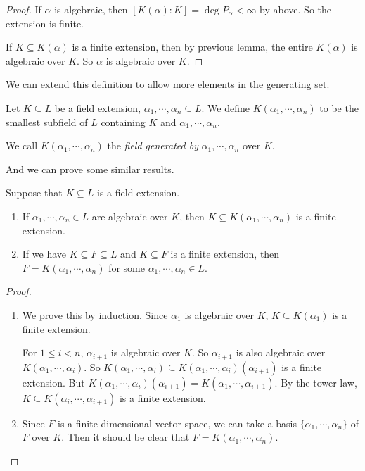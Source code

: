 \documentclass[a4paper]{article}
\begin{document}
\begin{proof}
  If $\alpha$ is algebraic, then $[K(\alpha): K] = \deg P_\alpha < \infty$ by above. So the extension is finite.

  If $K\subseteq K(\alpha)$ is a finite extension, then by previous lemma, the entire $K(\alpha)$ is algebraic over $K$. So $\alpha$ is algebraic over $K$.
\end{proof}

We can extend this definition to allow more elements in the generating set.
\begin{defi}
  Let $K\subseteq L$ be a field extension, $\alpha_1, \cdots, \alpha_n\subseteq L$. We define $K(\alpha_1, \cdots, \alpha_n)$ to be the smallest subfield of $L$ containing $K$ and $\alpha_1, \cdots, \alpha_n$.

  We call $K(\alpha_1, \cdots, \alpha_n)$ the \emph{field generated by} $\alpha_1, \cdots, \alpha_n$ over $K$.
\end{defi}

And we can prove some similar results.

\begin{thm}
  Suppose that $K\subseteq L$ is a field extension.
  \begin{enumerate}
    \item If $\alpha_1, \cdots, \alpha_n \in L$ are algebraic over $K$, then $K\subseteq K(\alpha_1, \cdots, \alpha_n)$ is a finite extension.
    \item If we have $K\subseteq F\subseteq L$ and $K\subseteq F$ is a finite extension, then $F = K(\alpha_1, \cdots, \alpha_n)$ for some $\alpha_1,\cdots, \alpha_n \in L$.
  \end{enumerate}
\end{thm}

\begin{proof}\leavevmode
  \begin{enumerate}
    \item We prove this by induction. Since $\alpha_1$ is algebraic over $K$, $K\subseteq K(\alpha_1)$ is a finite extension.

      For $1 \leq i < n$, $\alpha_{i + 1}$ is algebraic over $K$. So $\alpha_{i + 1}$ is also algebraic over $K(\alpha_1, \cdots, \alpha_i)$. So $K(\alpha_1, \cdots, \alpha_i)\subseteq K(\alpha_1, \cdots, \alpha_i)(\alpha_{i + 1})$ is a finite extension. But $K(\alpha_1, \cdots, \alpha_i)(\alpha_{i + 1}) = K(\alpha_1, \cdots, \alpha_{i + 1})$. By the tower law, $K \subseteq K(\alpha_i, \cdots, \alpha_{i + 1})$ is a finite extension.

    \item Since $F$ is a finite dimensional vector space, we can take a basis $\{\alpha_1, \cdots, \alpha_n\}$ of $F$ over $K$. Then it should be clear that $F = K(\alpha_1, \cdots, \alpha_n)$.
  \end{enumerate}
\end{proof}
\end{document}

